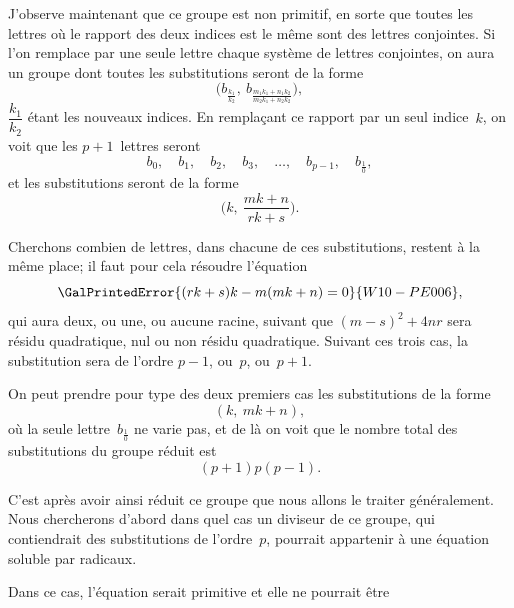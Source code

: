 
J'observe maintenant que ce groupe est non primitif, en sorte
que toutes les lettres où le rapport des deux indices est le même
sont des lettres conjointes. Si l'on remplace par une seule lettre
chaque système de lettres conjointes, on aura un groupe dont
toutes les substitutions seront de la forme
\[
\biggl(b_{\frac{k_{1}}{k_{2}}},\
      b_{\frac{m_{1} k_{1} + n_{1} k_{2}}{m_{2} k_{1} + n_{2} k_{2}}}\biggr),
\]
$\dfrac{k_{1}}{k_{2}}$ étant les nouveaux indices. En remplaçant ce rapport par un
seul indice~$k$, on voit que les $p + 1$~lettres seront
\[
b_{0}, \quad b_{1}, \quad b_{2}, \quad b_{3}, \quad \dots, \quad b_{p-1}, \quad b_{\frac{1}{0}},
\]
et les substitutions seront de la forme
\[
\biggl(k,\ \frac{mk + n}{rk + s}\biggr).
\]

Cherchons combien de lettres, dans chacune de ces substitutions,
restent à la même place; il faut pour cela résoudre l'équation
\[
\GalPrintedError{(rk + s)k - m(mk + n) = 0}{W10-PE006},
\]
qui aura deux, ou une, ou aucune racine, suivant que $(m - s)^{2} + 4nr$
sera résidu quadratique, nul ou non résidu quadratique. Suivant
ces trois cas, la substitution sera de l'ordre $p - 1$, ou~$p$, ou~$p + 1$.

On peut prendre pour type des deux premiers cas les substitutions
de la forme
\[
(k,\ mk + n),
\]
où la seule lettre~$b_{\frac{1}{0}}$ ne varie pas, et de là on voit que le nombre
total des substitutions du groupe réduit est
\[
(p + 1)p(p - 1).
\]

C'est après avoir ainsi réduit ce groupe que nous allons le
traiter généralement. Nous chercherons d'abord dans quel cas un
diviseur de ce groupe, qui contiendrait des substitutions de
l'ordre~$p$, pourrait appartenir à une équation soluble par radicaux.

Dans ce cas, l'équation serait primitive et elle ne pourrait être
